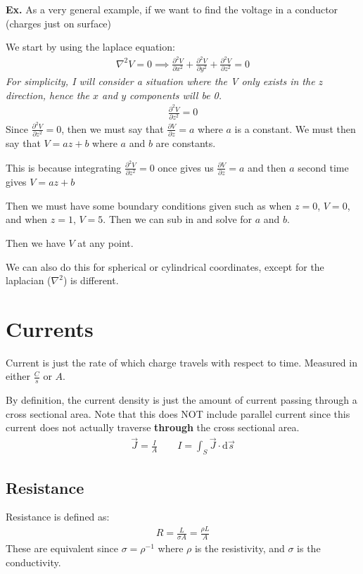 \documentclass[12pt,letterpaper]{article} \usepackage{amsmath} \usepackage{graphicx} \usepackage[margin=1in]{geometry} \usepackage{longtable}  \usepackage{amssymb}
\begin{document}
	\begin{mdframed}
		\textbf{Ex. } As a very general example, if we want to find the voltage in a conductor (charges just on surface)
		
		We start by using the laplace equation:
		\begin{align*}
			\nabla^2 V = 0 \implies \frac{\partial^2 V}{\partial x^2} + \frac{\partial^2 V}{\partial y^2} + \frac{\partial^2 V}{\partial z^2} = 0
		\end{align*}
		\textit{For simplicity, I will consider a situation where the V only exists in the $z$ direction, hence the $x$ and $y$ components will be 0.}
		\begin{align*}
			\frac{\partial^2 V}{\partial z^2} = 0
		\end{align*}
		Since $\frac{\partial^2 V}{\partial z^2}=0$, then we must say that $\frac{\partial V}{\partial z} = a$ where $a$ is a constant. We must then say that $V = az+b$ where $a$ and $b$ are constants.
		
		This is because integrating $\frac{\partial^2 V}{\partial z^2}=0$ once gives us $\frac{\partial V}{\partial z}=a$ and then $a$ second time gives $V=az+b$
		
		Then we must have some boundary conditions given such as when $z=0$, $V=0$, and when $z=1$, $V=5$. Then we can sub in and solve for $a$ and $b$.
		
		Then we have $V$ at any point.
	\end{mdframed}

	We can also do this for spherical or cylindrical coordinates, except for the laplacian ($\nabla^2$) is different.
	
	\section{Currents}
	Current is just the rate of which charge travels with respect to time. Measured in either $\frac{C}{s}$ or $A$.
	
	By definition, the current density is just the amount of current passing through a cross sectional area. Note that this does NOT include parallel current since this current does not actually traverse \textbf{through} the cross sectional area.
	\begin{align*}
		\vec J=\frac{I}{A} \qquad I = \int_S \vec J \cdot \mathrm d \vec s
	\end{align*}

	\subsection{Resistance}
	Resistance is defined as:
	\begin{align*}
		R = \frac{L}{\sigma A} = \frac{\rho L}{A}
	\end{align*}
	These are equivalent since $\sigma = \rho^{-1}$ where $\rho$ is the resistivity, and $\sigma$ is the conductivity.
	
\end{document}
